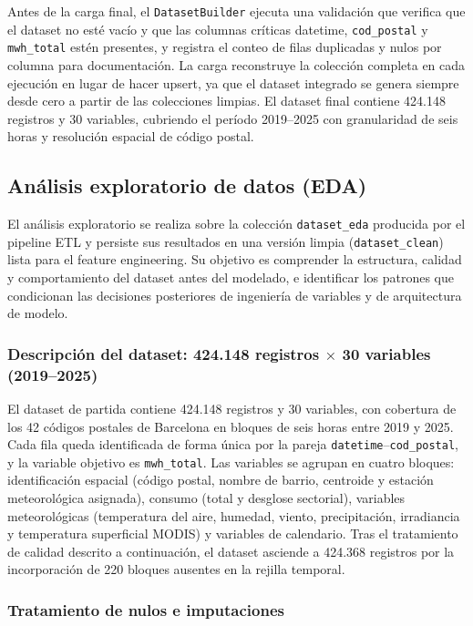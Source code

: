 \documentclass[12pt, a4paper]{article}
\begin{document}
Antes de la carga final, el \texttt{DatasetBuilder} ejecuta una validación que verifica que el dataset no esté vacío y que las columnas críticas datetime, \texttt{cod\_postal} y \texttt{mwh\_total} estén presentes, y registra el conteo de filas duplicadas y nulos por columna para documentación. La carga reconstruye la colección completa en cada ejecución en lugar de hacer upsert, ya que el dataset integrado se genera siempre desde cero a partir de las colecciones limpias. El dataset final contiene 424.148 registros y 30 variables, cubriendo el período 2019--2025 con granularidad de seis horas y resolución espacial de código postal.

\subsection{Análisis exploratorio de datos (EDA)}


El análisis exploratorio se realiza sobre la colección \texttt{dataset\_eda} producida por el pipeline ETL y persiste sus resultados en una versión limpia (\texttt{dataset\_clean}) lista para el feature engineering. Su objetivo es comprender la estructura, calidad y comportamiento del dataset antes del modelado, e identificar los patrones que condicionan las decisiones posteriores de ingeniería de variables y de arquitectura de modelo.

\subsubsection{Descripción del dataset: 424.148 registros $\times$ 30 variables (2019--2025)}


El dataset de partida contiene 424.148 registros y 30 variables, con cobertura de los 42 códigos postales de Barcelona en bloques de seis horas entre 2019 y 2025. Cada fila queda identificada de forma única por la pareja \texttt{datetime}--\texttt{cod\_postal}, y la variable objetivo es \texttt{mwh\_total}. Las variables se agrupan en cuatro bloques: identificación espacial (código postal, nombre de barrio, centroide y estación meteorológica asignada), consumo (total y desglose sectorial), variables meteorológicas (temperatura del aire, humedad, viento, precipitación, irradiancia y temperatura superficial MODIS) y variables de calendario. Tras el tratamiento de calidad descrito a continuación, el dataset asciende a 424.368 registros por la incorporación de 220 bloques ausentes en la rejilla temporal.

\subsubsection{Tratamiento de nulos e imputaciones}
\end{document}
